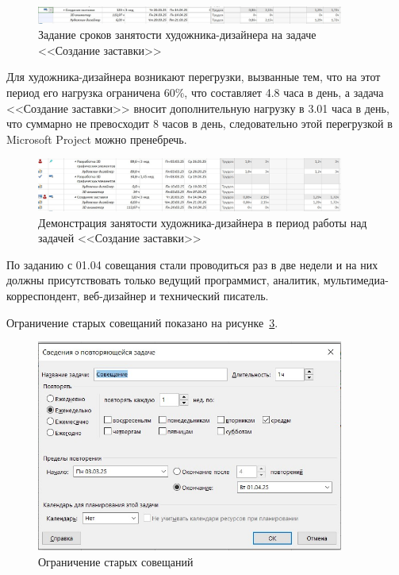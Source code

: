 \begin{figure}[H]
	\centering
	\includegraphics[width=0.9\textwidth]{img/lab4/screen10_1.jpg}
	\caption{Задание сроков занятости художника-дизайнера на задаче <<Создание заставки>>}
	\label{fig:screen10_1}
\end{figure}

Для художника-дизайнера возникают перегрузки, вызванные тем, что на этот период его нагрузка ограничена 60\%, что составляет 4.8 часа в день, а задача <<Создание заставки>> вносит дополнительную нагрузку в 3.01 часа в день, что суммарно не превосходит 8 часов в день, следовательно этой перегрузкой в Microsoft Project можно пренебречь.

\begin{figure}[H]
	\centering
	\includegraphics[width=0.9\textwidth]{img/lab4/screen16.jpg}
	\caption{Демонстрация занятости художника-дизайнера в период работы над задачей <<Создание заставки>>}
	\label{fig:screen16}
\end{figure}

По заданию с 01.04 совещания стали проводиться раз в две недели и на них должны присутствовать только ведущий программист, аналитик, мультимедиа-корреспондент, веб-дизайнер и технический писатель.

Ограничение старых совещаний показано на рисунке~\ref{fig:screen11}.

\begin{figure}[H]
	\centering
	\includegraphics[width=0.9\textwidth]{img/lab4/screen11.jpg}
	\caption{Ограничение старых совещаний}
	\label{fig:screen11}
\end{figure}

